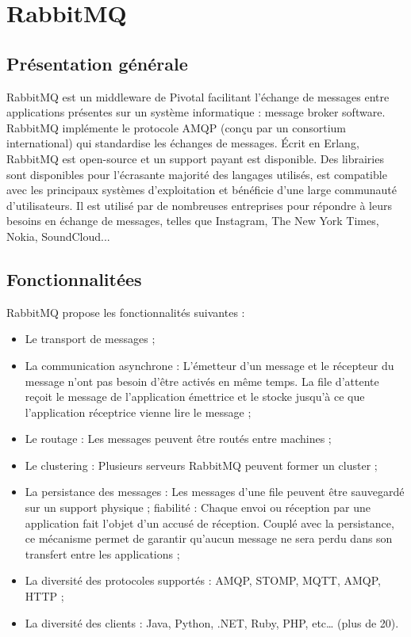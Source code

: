 \section{RabbitMQ}

\subsection{Présentation générale}

RabbitMQ est un middleware de Pivotal facilitant l’échange de messages entre applications présentes sur un système informatique :  message broker software. RabbitMQ implémente le protocole AMQP (conçu par un consortium international) qui standardise les échanges de messages. Écrit en Erlang, RabbitMQ est open-source et un support payant est disponible. Des librairies sont disponibles pour l’écrasante majorité des langages utilisés, est compatible avec les principaux systèmes d’exploitation et bénéficie d’une large communauté d’utilisateurs. Il est utilisé par de nombreuses entreprises pour répondre à leurs besoins en échange de messages, telles que Instagram, The New York Times, Nokia, SoundCloud...

\subsection{Fonctionnalitées}

RabbitMQ propose les fonctionnalités suivantes :

\begin{itemize}
  \item Le transport de messages ;
  \item La communication asynchrone : L’émetteur d'un message et le récepteur du message n'ont pas besoin d'être activés en même temps. La file d’attente reçoit le message de l'application émettrice et le stocke jusqu'à ce que l'application réceptrice vienne lire le message ;
  \item Le routage : Les messages peuvent être routés entre machines ;
  \item Le clustering : Plusieurs serveurs RabbitMQ peuvent former un cluster ;
  \item La persistance des messages : Les messages d’une file peuvent être sauvegardé sur un support physique ;
  \itemLa fiabilité : Chaque envoi ou réception par une application fait l'objet d'un accusé de réception. Couplé avec la persistance, ce mécanisme permet de garantir qu'aucun message ne sera perdu dans son transfert entre les applications ;
  \item La diversité des protocoles supportés : AMQP, STOMP, MQTT, AMQP, HTTP ;
  \item La diversité des clients : Java, Python, .NET, Ruby, PHP, etc… (plus de 20).
\end{itemize}

